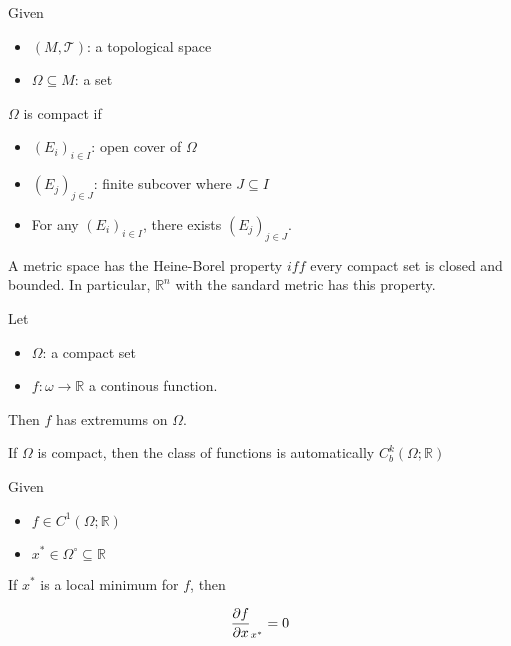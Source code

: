 \begin{definition}

    Given
    \begin{itemize}
        \item $(M,\mathcal{T})$: a topological space
        \item $\Omega \subseteq M$: a set
    \end{itemize}

    $\Omega$ is compact if
    
    \begin{itemize}
        \item $(E_i)_{i\in I}$: open cover of $\Omega$
        \item $(E_j)_{j\in J}$: finite subcover where $J \subseteq I$
        \item For any $(E_i)_{i\in I}$, there exists $(E_j)_{j\in J}$.
    \end{itemize}
\end{definition}

\begin{theorem}

    A metric space has the Heine-Borel property $iff$ every compact set is closed and bounded. In particular, $\mathbb{R}^n$ with the sandard metric has this property.
    
\end{theorem}

\begin{theorem}
    
    Let
    \begin{itemize}
        \item $\Omega$: a compact set
        \item $f:\omega\to\mathbb{R}$ a continous function.
    \end{itemize}

    Then $f$ has extremums on $\Omega$.

    \begin{remark}
        If $\Omega$ is compact, then the class of functions is automatically $C^k_b(\Omega;\mathbb{R})$
    \end{remark}

\end{theorem}

\begin{theorem}
    
    Given
    \begin{itemize}
        \item $f\in C^1(\Omega;\mathbb{R})$
        \item $x^* \in \Omega^\circ \subseteq \mathbb{R}$
    \end{itemize}

    If $x^*$ is a local minimum for $f$, then
    
    \begin{equation*}
        \pdv{f}{x}_{x^*} = 0
    \end{equation*}

\end{theorem}

